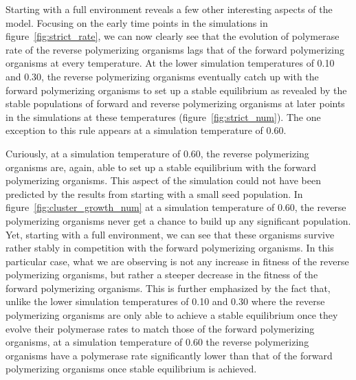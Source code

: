 Starting with a full environment reveals a few other interesting aspects of the model. Focusing on the early time points in the simulations in figure~\ref{fig:strict_rate}, we can now clearly see that the evolution of polymerase rate of the reverse polymerizing organisms lags that of the forward polymerizing organisms at every temperature. At the lower simulation temperatures of 0.10 and 0.30, the reverse polymerizing organisms eventually catch up with the forward polymerizing organisms to set up a stable equilibrium as revealed by the stable populations of forward and reverse polymerizing organisms at later points in the simulations at these temperatures (figure~\ref{fig:strict_num}). The one exception to this rule appears at a simulation temperature of 0.60.

Curiously, at a simulation temperature of 0.60, the reverse polymerizing organisms are, again, able to set up a stable equilibrium with the forward polymerizing organisms. This aspect of the simulation could not have been predicted by the results from starting with a small seed population. In figure~\ref{fig:cluster_growth_num} at a simulation temperature of 0.60, the reverse polymerizing organisms never get a chance to build up any significant population. Yet, starting with a full environment, we can see that these organisms survive rather stably in competition with the forward polymerizing organisms. In this particular case, what we are observing is not any increase in fitness of the reverse polymerizing organisms, but rather a steeper decrease in the fitness of the forward polymerizing organisms. This is further emphasized by the fact that, unlike the lower simulation temperatures of 0.10 and 0.30 where the reverse polymerizing organisms are only able to achieve a stable equilibrium once they evolve their polymerase rates to match those of the forward polymerizing organisms, at a simulation temperature of 0.60 the reverse polymerizing organisms have a polymerase rate significantly lower than that of the forward polymerizing organisms once stable equilibrium is achieved.

